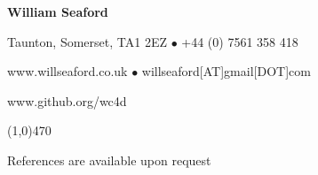 \documentclass[11pt]{article}
\begin{document}
\centerline{\LARGE \bf William Seaford}					
\centerline{Taunton, Somerset, TA1 2EZ $\bullet$ +44 (0) 7561 358 418}
\centerline{www.willseaford.co.uk $\bullet$ willseaford[AT]gmail[DOT]com}
\centerline{www.github.org/wc4d}
\noindent 												
\line(1,0){470}
\newline



\pagebreak


\centerline{References are available upon request}
\end{document}
